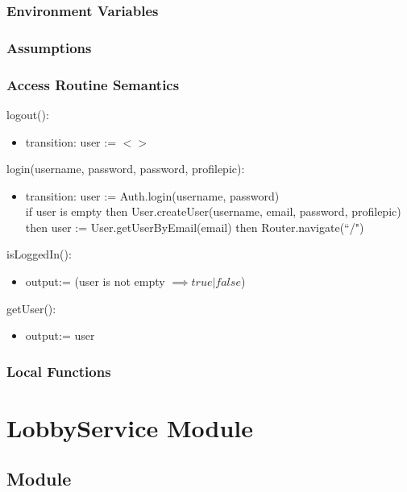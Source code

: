 \documentclass[12pt, titlepage]{article}
\begin{document}
\subsubsection{Environment Variables}

\subsubsection{Assumptions}

\subsubsection{Access Routine Semantics}

\noindent logout():
\begin{itemize}
\item transition: user := $<>$\\
\end{itemize}

\noindent login(username, password, password, profilepic):
\begin{itemize}
\item transition: user := Auth.login(username, password)\\
if user is empty then User.createUser(username, email, password, profilepic) then user := User.getUserByEmail(email) then Router.navigate(``/")
\end{itemize}

\noindent isLoggedIn():
\begin{itemize} 
\item output:= (user is not empty $\implies true | false$)
\end{itemize}

\noindent getUser():
\begin{itemize}
\item output:= user
\end{itemize}

\subsubsection{Local Functions}

\newpage


\section{LobbyService Module} \label{LobbyService} 

\subsection{Module}
\end{document}
